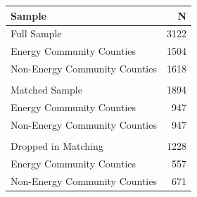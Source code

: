 \begin{tabular}{lr}
  \toprule
Sample & N \\ 
  \midrule
Full Sample & 3122 \\ 
  \quad Energy Community Counties & 1504 \\ 
  \quad Non-Energy Community Counties & 1618 \\ 
   &  \\ 
  Matched Sample & 1894 \\ 
  \quad Energy Community Counties & 947 \\ 
  \quad Non-Energy Community Counties & 947 \\ 
   &  \\ 
  Dropped in Matching & 1228 \\ 
  \quad Energy Community Counties & 557 \\ 
  \quad Non-Energy Community Counties & 671 \\ 
   \bottomrule
\end{tabular}
